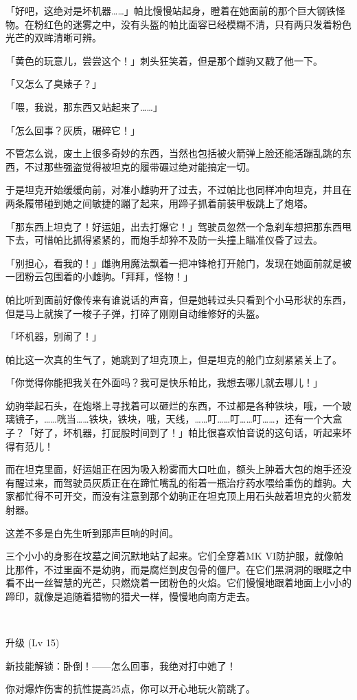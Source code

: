 「好吧，这绝对是坏机器……」帕比慢慢站起身，瞪着在她面前的那个巨大钢铁怪物。在粉红色的迷雾之中，没有头盔的帕比面容已经模糊不清，只有两只发着粉色光芒的双眸清晰可辨。

「黄色的玩意儿，尝尝这个！」刺头狂笑着，但是那个雌驹又戳了他一下。

「又怎么了臭婊子？」

「喂，我说，那东西又站起来了……」

「怎么回事？灰质，碾碎它！」

不管怎么说，废土上很多奇妙的东西，当然也包括被火箭弹上脸还能活蹦乱跳的东西，不过那些强盗觉得被坦克的履带碾过绝对能搞定一切。

于是坦克开始缓缓向前，对准小雌驹开了过去，不过帕比也同样冲向坦克，并且在两条履带碰到她之间敏捷的蹦了起来，用蹄子抓着前装甲板跳上了炮塔。

「那东西上坦克了！好运姐，出去打爆它！」驾驶员忽然一个急刹车想把那东西甩下去，可惜帕比抓得紧紧的，而炮手却猝不及防一头撞上瞄准仪昏了过去。

「别担心，看我的！」雌驹用魔法飘着一把冲锋枪打开舱门，发现在她面前就是被一团粉云包围着的小雌驹。「拜拜，怪物！」

帕比听到面前好像传来有谁说话的声音，但是她转过头只看到个小马形状的东西，但是马上就挨了一梭子子弹，打碎了刚刚自动维修好的头盔。

「坏机器，别闹了！」

帕比这一次真的生气了，她跳到了坦克顶上，但是坦克的舱门立刻紧紧关上了。

「你觉得你能把我关在外面吗？我可是快乐帕比，我想去哪儿就去哪儿！」

幼驹举起石头，在炮塔上寻找着可以砸烂的东西，不过都是各种铁块，哦，一个玻璃镜子，……咣当……铁块，铁块，哦，天线，……叮……叮……叮……，还有一个大盒子？「好了，坏机器，打屁股时间到了！」帕比很喜欢怕音说的这句话，听起来坏得有范儿！

而在坦克里面，好运姐正在因为吸入粉雾而大口吐血，额头上肿着大包的炮手还没有醒过来，而驾驶员灰质正在在蹄忙嘴乱的衔着一瓶治疗药水喂给重伤的雌驹。大家都忙得不可开交，而没有注意到那个幼驹正在坦克顶上用石头敲着坦克的火箭发射器。

这差不多是白先生听到那声巨响的时间。

\horizonline


三个小小的身影在坟墓之间沉默地站了起来。它们全穿着MK VI防护服，就像帕比那件，不过里面不是幼驹，而是腐烂到皮包骨的僵尸。在它们黑洞洞的眼眶之中看不出一丝智慧的光芒，只燃烧着一团粉色的火焰。它们慢慢地跟着地面上小小的蹄印，就像是追随着猎物的猎犬一样，慢慢地向南方走去。


~\vfill

\begin{note}
    升级 (Lv 15) 

    新技能解锁：卧倒！——怎么回事，我绝对打中她了！

    你对爆炸伤害的抗性提高25点，你可以开心地玩火箭跳了。
\end{note}


